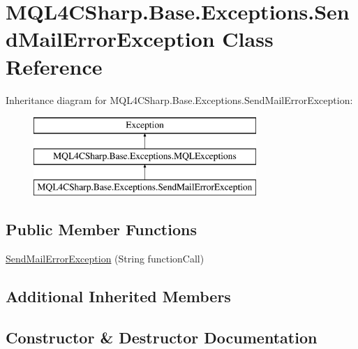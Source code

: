 \hypertarget{class_m_q_l4_c_sharp_1_1_base_1_1_exceptions_1_1_send_mail_error_exception}{}\section{M\+Q\+L4\+C\+Sharp.\+Base.\+Exceptions.\+Send\+Mail\+Error\+Exception Class Reference}
\label{class_m_q_l4_c_sharp_1_1_base_1_1_exceptions_1_1_send_mail_error_exception}
Inheritance diagram for M\+Q\+L4\+C\+Sharp.\+Base.\+Exceptions.\+Send\+Mail\+Error\+Exception\+:\begin{figure}[H]
\begin{center}
\leavevmode
\includegraphics[height=3.000000cm]{class_m_q_l4_c_sharp_1_1_base_1_1_exceptions_1_1_send_mail_error_exception}
\end{center}
\end{figure}
\subsection*{Public Member Functions}
\begin{DoxyCompactItemize}
\item 
\hyperlink{class_m_q_l4_c_sharp_1_1_base_1_1_exceptions_1_1_send_mail_error_exception_ae46b3aeb3a7501a1b4a49ed5d1d85c8e}{Send\+Mail\+Error\+Exception} (String function\+Call)
\end{DoxyCompactItemize}
\subsection*{Additional Inherited Members}


\subsection{Constructor \& Destructor Documentation}

